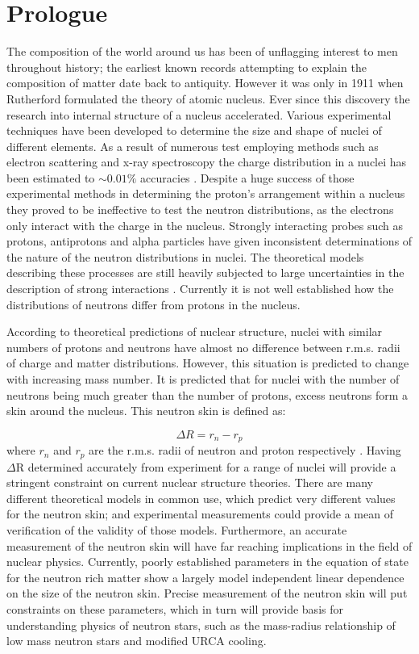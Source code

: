 \chapter{Prologue}

\indent The composition of the world around us has been of unflagging interest to men throughout history; the earliest known records attempting to explain the composition of matter date back to antiquity. However it was only in 1911 when Rutherford formulated the theory of atomic nucleus. Ever since this discovery the research into internal structure of a nucleus accelerated. Various experimental techniques have been developed to determine the size and shape of nuclei of different elements. As a result of numerous test employing methods such as electron scattering and x-ray spectroscopy the charge distribution in a nuclei has been estimated to $\sim0.01\%$ accuracies \cite{devires}. Despite a huge success of those experimental methods in determining the proton's arrangement within a nucleus they proved to be ineffective to test the neutron distributions, as the electrons only interact with the charge in the nucleus. Strongly interacting probes such as protons, antiprotons and alpha particles have given inconsistent determinations of the nature of the neutron distributions in nuclei. The theoretical models describing these processes are still heavily subjected to large uncertainties in the description of strong interactions \cite{claire}. Currently it is not well established how the distributions of neutrons differ from protons in the nucleus.

\indent According to theoretical predictions of nuclear structure, nuclei with similar numbers of protons and neutrons have almost no difference between r.m.s. radii of charge and matter distributions. However, this situation is predicted to change with increasing mass number. It is predicted that for nuclei with the number of neutrons being much greater than the number of protons, excess neutrons form a skin around the nucleus. This neutron skin is defined as:

\begin{equation}
\Delta R = r_{n} - r_{p}
\end{equation}
where $r_{n}$ and $r_{p}$ are the r.m.s. radii of neutron and proton respectively \cite{roca}. Having $\Delta$R determined accurately from experiment for a range of nuclei will provide a stringent constraint on current nuclear structure theories. There are many different theoretical models in common use, which predict very different values for the neutron skin; and experimental measurements could provide a mean of verification of the validity of those models. Furthermore, an accurate measurement of the neutron skin will have far reaching implications in the field of nuclear physics. Currently, poorly established parameters in the equation of state for the neutron rich matter show a largely model independent linear dependence on the size of the neutron skin. Precise measurement of the neutron skin will put constraints on these parameters, which in turn will provide basis for understanding physics of neutron stars, such as the mass-radius relationship of low mass neutron stars and modified URCA cooling.

